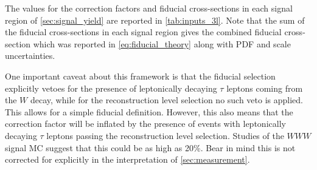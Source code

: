 The values for the correction factors and fiducial cross-sections
in each signal region of \sec\ref{sec:signal_yield}
are reported in \tab\ref{tab:inputs_3l}.
Note that the sum of the fiducial cross-sections
in each signal region gives the combined fiducial cross-section
which was reported in \eqn\ref{eq:fiducial_theory} along with 
PDF and scale uncertainties.



One important caveat about this framework is that the fiducial selection explicitly vetoes
for the presence of leptonically decaying $\tau$ leptons coming from the $W$ decay, 
while for the reconstruction level selection no such veto is applied. 
This allows for a simple fiducial definition.
However, this also means that the correction factor will be inflated by the presence of 
events with leptonically decaying $\tau$ leptons passing the reconstruction
level selection. Studies of the $WWW$ signal MC suggest that this could be 
as high as 20\%. Bear in mind this is not corrected for explicitly in the interpretation
of \sec\ref{sec:measurement}.

